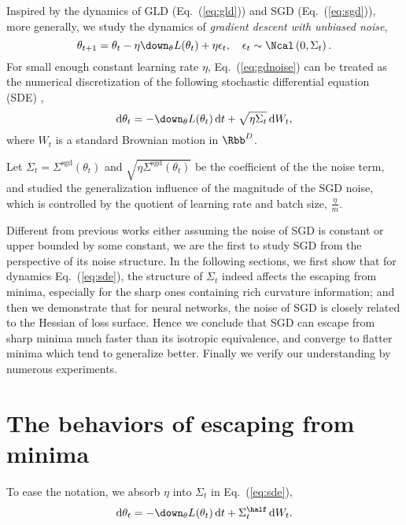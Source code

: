 \documentclass{article}
\begin{document}
Inspired by the dynamics of GLD (Eq.~(\ref{eq:gld})) and SGD (Eq.~(\ref{eq:sgd})), more generally, we study the dynamics of \emph{gradient descent with unbiased noise},
\begin{equation}
    \theta_{t+1} = \theta_t - \eta \down_{\theta}L(\theta_t) + \eta\epsilon_t, \quad \epsilon_t \sim \Ncal \left(0, \Sigma_t \right).
    \label{eq:gdnoise}
\end{equation}
For small enough constant learning rate $\eta$, Eq.~(\ref{eq:gdnoise})
can be treated as the numerical discretization of the following stochastic differential equation (SDE)
\citep{li2017stochastic,jastrzkebski2017three,chaudhari2017stochastic},
\begin{equation}
    \dif \theta_t = -\down_{\theta} L(\theta_t) \dif t  + \sqrt{\eta\Sigma_t}\dif W_t,
    \label{eq:sde}
\end{equation}
where $W_t$ is a standard Brownian motion in $\Rbb^D$.

Let $\Sigma_t=\Sigma^{\text{sgd}}(\theta_t)$ and $\sqrt{\eta\Sigma^{\text{sgd}}(\theta_t)}$ be the coefficient of the the noise term, \citet{hoffer2017} and \citet{jastrzkebski2017three} studied the generalization influence of the magnitude of the SGD noise, which is controlled by the quotient of learning rate and batch size, $\frac{\eta}{m}$.

Different from previous works either assuming the noise of SGD is constant or upper bounded by some constant, we are the first to study SGD from the perspective of its noise structure.
In the following sections,
we first show that for dynamics Eq.~(\ref{eq:sde}), the structure of $\Sigma_t$ indeed affects the escaping from minima, especially for the sharp ones containing rich curvature information; and then we demonstrate that for neural networks, the noise of SGD is closely related to the Hessian of loss surface.
Hence we conclude that SGD can escape from sharp minima much faster than its isotropic equivalence, and converge to flatter minima which tend to generalize better.
Finally we verify our understanding by numerous experiments.



\section{The behaviors of escaping from minima}
\label{sec:ou}

To ease the notation, we absorb $\eta$ into $\Sigma_t$ in Eq.~(\ref{eq:sde}), 
\begin{equation}
    \dif \theta_t = -\down_{\theta} L(\theta_t) \dif t  + \Sigma_t^{\half}\dif W_t.
    \label{eq:sde1}
\end{equation}
\end{document}
